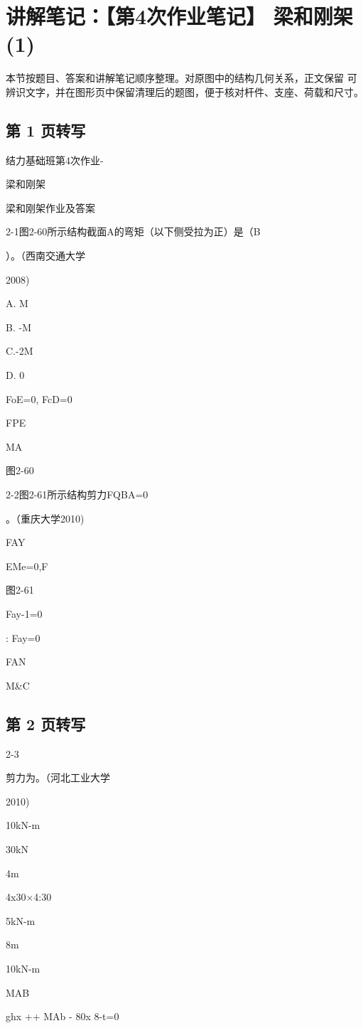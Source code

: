 \section{讲解笔记：【第4次作业笔记】 梁和刚架(1)}
\begin{analysisbox}
本节按题目、答案和讲解笔记顺序整理。对原图中的结构几何关系，正文保留 可辨识文字，并在图形页中保留清理后的题图，便于核对杆件、支座、荷载和尺寸。
\end{analysisbox}
\subsection*{第 1 页转写}
结力基础班第4次作业-

梁和刚架

梁和刚架作业及答案

2-1图2-60所示结构截面A的弯矩（以下侧受拉为正）是（B

）。（西南交通大学

2008)

A. M

B. -M

C.-2M

D. 0

FoE=0, FcD=0

FPE

MA

图2-60

2-2图2-61所示结构剪力FQBA=0

。（重庆大学2010)

FAY

EMe=0,F

图2-61

Fay-1=0

: Fay=0

FAN

M\&C

\subsection*{第 2 页转写}
2-3

剪力为。（河北工业大学

2010)

10kN-m

30kN

4m

4x30$\times$4:30

5kN-m

8m

10kN-m

MAB

ghx ++ MAb - 80x 8-t=0

